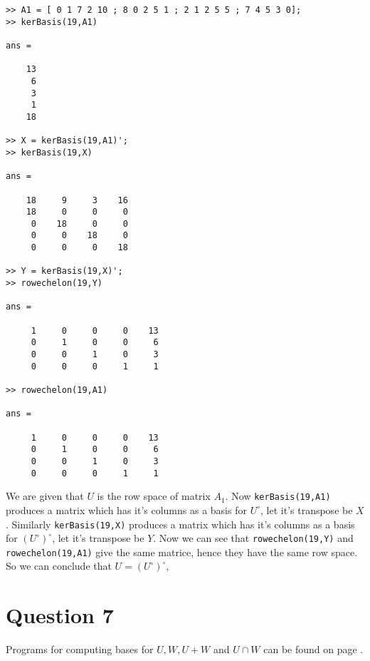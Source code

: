 \documentclass[11pt]{article}
\begin{document}
\begin{verbatim}
>> A1 = [ 0 1 7 2 10 ; 8 0 2 5 1 ; 2 1 2 5 5 ; 7 4 5 3 0];
>> kerBasis(19,A1)

ans =

    13
     6
     3
     1
    18

>> X = kerBasis(19,A1)';
>> kerBasis(19,X)

ans =

    18     9     3    16
    18     0     0     0
     0    18     0     0
     0     0    18     0
     0     0     0    18

>> Y = kerBasis(19,X)';
>> rowechelon(19,Y)

ans =

     1     0     0     0    13
     0     1     0     0     6
     0     0     1     0     3
     0     0     0     1     1

>> rowechelon(19,A1)

ans =

     1     0     0     0    13
     0     1     0     0     6
     0     0     1     0     3
     0     0     0     1     1
\end{verbatim}

We are given that $U$ is the row space of matrix $A_1$. Now \texttt{kerBasis(19,A1)} produces a matrix which has it's columns as a basis for $U^{\circ}$, let it's transpose be $X$. Similarly \texttt{kerBasis(19,X)} produces a matrix which has it's columns as a basis for $(U^{\circ})^{\circ}$, let it's transpose be $Y$. Now we can see that \texttt{rowechelon(19,Y)} and \texttt{rowechelon(19,A1)} give the same matrice, hence they have the same row space. So we can conclude that $U=(U^{\circ})^{\circ}$,






\section*{Question 7}

Programs for computing bases for $U,W,U+W$ and $U\cap W$ can be found on page \pageref{sec:program7}. 

\end{document}
